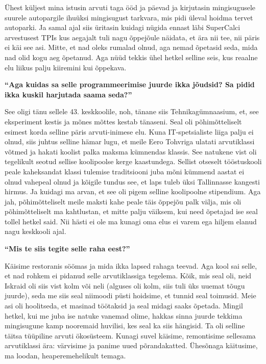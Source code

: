 Ühest küljest  mina istusin arvuti taga ööd ja päevad ja kirjutasin mingisugusele suurele autopargile ihuüksi  mingisugust tarkvara, mis pidi üleval hoidma tervet autoparki. Ja samal ajal siis üritasin kuidagi nügida ennast läbi SuperCalci arvestusest TPIs kus aegajalt tuli nagu õppejõule näidata, et ära nii tee, nii päris ei käi see asi. Mitte, et nad oleks rumalad olnud, aga nemad õpetasid seda, mida nad olid kogu aeg õpetanud. Aga nüüd tekkis ühel hetkel selline seis, kus reaalne elu liikus palju kiiremini kui õppekava.

\textbf{\enquote{Aga kuidas sa selle programmeerimise juurde ikka jõudsid? Sa pidid ikka kuskil harjutada saama seda?}}

See oligi  tänu sellele 43. keskkoolile, noh, tänane siis Tehnikagümnaasium, et, see eksperiment kestis ja mõnes mõttes kestab tänaseni. Seal oli põhimõtteliselt  esimest korda selline päris arvuti-inimese elu. Kuna IT-spetsialiste  liiga palju ei olnud, siis juhtus selline hämar lugu, et meile Eero Tohvriga ulatati arvutiklassi võtmed ja hakati koolist palka maksma kümnendas klassis. See natukene vist oli tegelikult seotud sellise koolipoolse kerge kaastundega. Sellist otseselt tööstuskooli peale kaheksandat klassi tulemise traditsiooni juba mõni kümmend aastat ei olnud vahepeal olnud ja kõigile tundus see, et laps tuleb üksi Tallinnasse kangesti hirmus. Ja kuidagi ma arvan, et see oli pigem selline koolipoolne stipendium. Aga jah, põhimõtteliselt meile maksti kahe peale täis õppejõu palk välja, mis oli põhimõtteliselt ma kahtlustan, et mitte palju väiksem, kui need õpetajad ise seal tollel hetkel said. Nii hästi ei ole ma kunagi oma elus ei varem ega hiljem elanud nagu keskkooli ajal. 

\textbf{\enquote{Mis te siis tegite selle raha eest?}}

Käisime restoranis söömas ja mida ikka lapsed rahaga teevad. Aga kool sai selle, et nad rohkem ei pidanud selle arvutiklassiga tegelema.  Kõik, mis seal oli, neid Iskraid oli siis vist kolm või neli (alguses oli kolm, siis tuli üks uuemat tõugu juurde), seda me siis seal niimoodi püsti hoidsime, et tunnid seal toimusid. Meie asi oli hoolitseda, et masinad töötaksid ja seal midagi saaks õpetada. Mingil hetkel, kui me juba ise natuke vanemad olime, hakkas sinna juurde tekkima mingisugune kamp nooremaid huvilisi, kes seal ka siis hängisid. Ta oli selline täitsa tüüpiline arvuti ökosüsteem. Kunagi suvel käisime, remontisime sellesama arvutiklassi ära: värvisime ja panime uued põrandakatted. Ühesõnaga käitusime, ma loodan,  heaperemehelikult temaga. 

